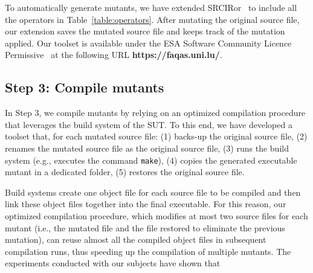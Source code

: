 

To automatically generate mutants, we have extended SRCIRor~\cite{hariri2018srciror} to include all the 
operators in Table~\ref{table:operators}. 
After mutating the original source file, our extension saves the mutated source file and keeps track of the mutation applied. Our toolset is available under the ESA Software Community Licence Permissive~\cite{ESAlicence} at the following URL \textbf{https://faqas.uni.lu/}.

\subsection{Step 3: Compile mutants}
\label{sec:appr:compile}

In Step 3, we 
compile mutants by relying on an optimized compilation procedure that leverages the build system of the SUT. To this end, we have developed a toolset that, for each mutated source file: (1) backs-up the original source file, (2) renames the mutated source file as the original source file, (3) runs the build system (e.g., executes the command \texttt{make}), (4) copies the generated executable mutant in a dedicated folder, (5) restores the original source file. 

Build systems  create one object file for each source file to be compiled and then link these object files together into the final executable. 
For this reason, our optimized compilation procedure, which modifies at most two source files for each mutant (i.e., the mutated file and the file restored to eliminate the previous mutation), can reuse almost all the compiled object files in subsequent compilation runs, thus speeding up the compilation of multiple mutants. The experiments conducted with our subjects have shown that 
 

